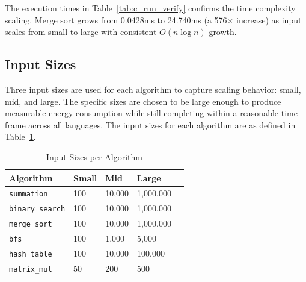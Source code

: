 The execution times in Table~\ref{tab:c_run_verify} confirms the time complexity scaling. Merge sort grows from 0.0428ms to 24.740ms (a 576$\times$ increase) as input scales from small to large with consistent $O(n \log n)$ growth.


\subsection{Input Sizes}
Three input sizes are used for each algorithm to capture scaling behavior: small, mid, and large. The specific sizes are chosen to be large enough to produce measurable energy consumption while still completing within a reasonable time frame across all languages. The input sizes for each algorithm are as defined in Table~\ref{tab:input_sizes}.


\begin{table}[h]
    \centering
    \caption{Input Sizes per Algorithm}\label{tab:input_sizes}
    \small
    \begin{tabular}{lllll}
        \hline
        \textbf{Algorithm} & \textbf{Small} & \textbf{Mid} & \textbf{Large}   \\
        \hline
            \texttt{summation}          & 100       & 10,000    &  1,000,000    \\
            \texttt{binary\_search}     & 100       & 10,000    &  1,000,000    \\
            \texttt{merge\_sort}        & 100       & 10,000    &  1,000,000    \\
            \texttt{bfs}                & 100       & 1,000     &  5,000        \\
            \texttt{hash\_table}        & 100       & 10,000    &  100,000      \\
            \texttt{matrix\_mul}        & 50        & 200       &  500          \\
        \hline
    \end{tabular}
\end{table}




